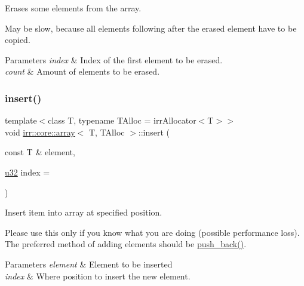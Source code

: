 Erases some elements from the array. 

May be slow, because all elements following after the erased element have to be copied. 
\begin{DoxyParams}{Parameters}
{\em index} & Index of the first element to be erased. \\
\hline
{\em count} & Amount of elements to be erased. \\
\hline
\end{DoxyParams}
\mbox{\label{classirr_1_1core_1_1array_a3b0f73c95dd449a4de576c6b1943566c}} 
\subsubsection{\texorpdfstring{insert()}{insert()}}
{\footnotesize\ttfamily template$<$class T, typename T\+Alloc = irr\+Allocator$<$\+T$>$$>$ \\
void \hyperlink{classirr_1_1core_1_1array}{irr\+::core\+::array}$<$ T, T\+Alloc $>$\+::insert (\begin{DoxyParamCaption}\item[{const T \&}]{element,  }\item[{\hyperlink{namespaceirr_a0416a53257075833e7002efd0a18e804}{u32}}]{index = {} }\end{DoxyParamCaption})\hspace{0.3cm}{\ttfamily [inline]}}



Insert item into array at specified position. 

Please use this only if you know what you are doing (possible performance loss). The preferred method of adding elements should be \hyperlink{classirr_1_1core_1_1array_ad2c9dff8592b95c25c59f5383fc633fe}{push\+\_\+back()}. 
\begin{DoxyParams}{Parameters}
{\em element} & Element to be inserted \\
\hline
{\em index} & Where position to insert the new element. \\
\hline
\end{DoxyParams}
\mbox{\label{classirr_1_1core_1_1array_aef6726fc4de8ca5a01881e09664981ad}} 
